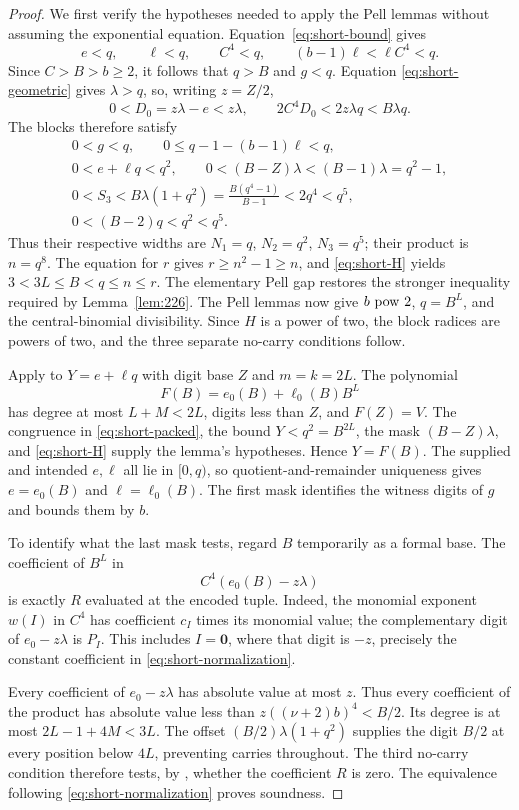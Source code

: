 \begin{proof}
We first verify the hypotheses needed to apply the Pell lemmas without
assuming the exponential equation. Equation~\eqref{eq:short-bound}
gives
\[
 e<q,\qquad \ell<q,\qquad C^4<q,
 \qquad (b-1)\ell<\ell C^4<q.
\]
Since $C>B>b\ge2$, it follows that $q>B$ and $g<q$. Equation
\eqref{eq:short-geometric} gives $\lambda>q$, so, writing $z=Z/2$,
\[
 0<D_0=z\lambda-e<z\lambda,
 \qquad 2C^4D_0<2z\lambda q<B\lambda q.
\]
The blocks therefore satisfy
\begin{gather*}
 0<g<q,\qquad 0\le q-1-(b-1)\ell<q,\\
 0<e+\ell q<q^2,\qquad
 0<(B-Z)\lambda<(B-1)\lambda=q^2-1,\\
 0<S_3<B\lambda(1+q^2)
      =\frac{B(q^4-1)}{B-1}<2q^4<q^5,\\
 0<(B-2)q<q^2<q^5.
\end{gather*}
Thus their respective widths are $N_1=q$, $N_2=q^2$, $N_3=q^5$;
their product is $n=q^8$. The equation for $r$ gives $r\ge n^2-1\ge n$,
and \eqref{eq:short-H} yields
$3<3L\le B<q\le n\le r$. The elementary Pell gap restores the
stronger inequality required by Lemma~\ref{lem:226}. The Pell lemmas
now give $b\ \mathrm{pow}\ 2$, $q=B^L$, and the central-binomial divisibility.
Since $H$ is a power of two, the block radices are powers of two, and the
three separate no-carry conditions follow.

Apply \cite[Lemma~2.9]{J82} to $Y=e+\ell q$ with digit base $Z$ and
$m=k=2L$. The polynomial
\[
 F(B)=e_0(B)+\ell_0(B)B^L
\]
has degree at most $L+M<2L$, digits less than $Z$, and $F(Z)=V$.
The congruence in \eqref{eq:short-packed}, the bound $Y<q^2=B^{2L}$,
the mask $(B-Z)\lambda$, and \eqref{eq:short-H} supply the lemma's
hypotheses. Hence $Y=F(B)$. The supplied and intended $e,\ell$ all lie
in $[0,q)$, so quotient-and-remainder uniqueness gives $e=e_0(B)$ and
$\ell=\ell_0(B)$. The first mask identifies the witness digits of $g$
and bounds them by $b$.

To identify what the last mask tests, regard $B$ temporarily as a formal
base. The coefficient of $B^L$ in
\[
 C^4(e_0(B)-z\lambda)
\]
is exactly $R$ evaluated at the encoded tuple. Indeed, the monomial
exponent $w(I)$ in $C^4$ has coefficient $c_I$ times its monomial value;
the complementary digit of $e_0-z\lambda$ is $P_I$. This includes
$I=\boldsymbol0$, where that digit is $-z$, precisely the constant
coefficient in \eqref{eq:short-normalization}.

Every coefficient of $e_0-z\lambda$ has absolute value at most $z$.
Thus every coefficient of the product has absolute value less than
$z((\nu+2)b)^4<B/2$. Its degree is at most $2L-1+4M<3L$.
The offset $(B/2)\lambda(1+q^2)$ supplies the digit $B/2$ at every
position below $4L$, preventing carries throughout. The third no-carry
condition therefore tests, by \cite[Lemma~2.8]{J82}, whether the
coefficient $R$ is zero. The equivalence following
\eqref{eq:short-normalization} proves soundness.


\end{proof}
